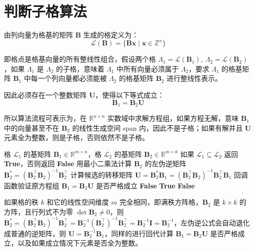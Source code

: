 \documentclass{article}
\begin{document}
\section{判断子格算法}
由列向量为格基的矩阵 $\bm{B}$ 生成的格定义为：
\[ \mathcal{L}(\bm{B})=\{\bm{B}\bm{x}\mid\bm{x}\in\mathbb{Z}^{n}\} \]

即格点是格基向量的所有整线性组合，假设两个格 $\Lambda_1=\mathcal{L}(\bm{B}_1),\ \Lambda_2=\mathcal{L}(\bm{B}_2)$，如果 $\Lambda_1$ 是 $\Lambda_2$ 的子格，意味着 $\Lambda_1$ 中所有向量必须属于 $\Lambda_2$，要求 $\Lambda_1$ 的格基矩阵 $\bm{B}_1$ 中每一个列向量都必须能被 $\Lambda_2$ 的格基矩阵 $\bm{B}_2$ 进行整线性表示。

因此必须存在一个整数矩阵 $\bm{U}$，使得以下等式成立：
\[ \bm{B}_1=\bm{B}_2\bm{U} \]

所以算法流程可表示为，在 $\mathbb{R}^{n\times n}$ 实数域中求解方程组，如果方程无解，意味 $\bm{B}_1$ 中的向量甚至不在 $\bm{B}_2$ 的线性生成空间 span 内，因此不是子格；如果有解并且 $\bm{U}$ 元素全为整数，则是子格，否则依然不是子格。

\begin{algorithm}[H]
    \caption{非满秩（列满秩）格}
    \begin{algorithmic}[1]
        \Require 格 $\mathcal{L}_1$ 的基矩阵 $\bm{B}_1\in \mathbb{R}^{m\times n}$，格 $\mathcal{L}_2$ 的基矩阵 $\bm{B}_2\in\mathbb{R}^{m\times k}$
        \Ensure 如果 $\mathcal{L}_1\subseteq\mathcal{L}_2$ 返回 \textbf{True}，否则返回 \textbf{False}
        \State 用最小二乘法计算 $\bm{B}_2$ 的左伪逆矩阵 $\bm{B}_2^{*}=(\bm{B}_2^{\top}\bm{B}_2)^{-1}\bm{B}_2^{\top}$
        \State 计算候选的转移矩阵 $\bm{U}=\bm{B}_2^{*}\bm{B}_1=(\bm{B}_2^{\top}\bm{B}_2)^{-1}\bm{B}_2^{\top}\bm{B}_1$ 
        \State 回调函数验证原方程组 $\bm{B}_1=\bm{B}_2\bm{U}$ 是否严格成立
            \State \Return \textbf{False} 
        \Else
             
                \State \Return \textbf{True}
            \Else
                \State \Return \textbf{False} 
            \EndIf
        \EndIf
    \end{algorithmic}
\end{algorithm}

如果格的秩 $k$ 和它的线性空间维度 $m$ 完全相同，即满秩方阵格，$\bm{B}_2$ 是 $k\times k$ 的方阵，且行列式不为零 $\det\bm{B}_2\neq0$，则 $\bm{B}_2^{*}=(\bm{B}_2^{\top}\bm{B}_2)^{-1}\bm{B}_2^{\top}=\bm{B}_2^{-1}(\bm{B}_2^{\top})^{-1}\bm{B}_2^{\top}=\bm{B}_2^{-1}\bm{I}=\bm{B}_2^{-1}$，左伪逆公式会自动退化成普通的逆矩阵，则 $\bm{U}=\bm{B}_2^{-1}\bm{B}_1$，同样的进行回代计算 $\bm{B}_1=\bm{B}_2\bm{U}$ 是否严格成立，以及如果成立情况下元素是否全为整数。
\end{document}
